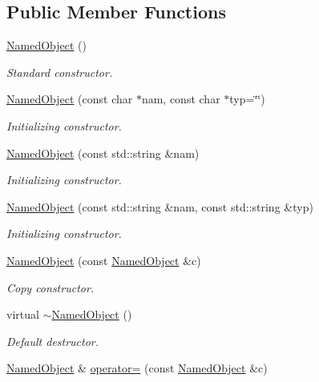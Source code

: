 \subsection*{Public Member Functions}
\begin{DoxyCompactItemize}
\item 
\hyperlink{class_d_d4hep_1_1_named_object_a210152aa261bc94e2012f6a0242faae0}{Named\+Object} ()
\begin{DoxyCompactList}\small\item\em Standard constructor. \end{DoxyCompactList}\item 
\hyperlink{class_d_d4hep_1_1_named_object_a8d1a329816f1cd08f79dc3fd34bd705a}{Named\+Object} (const char $\ast$nam, const char $\ast$typ=\char`\"{}\char`\"{})
\begin{DoxyCompactList}\small\item\em Initializing constructor. \end{DoxyCompactList}\item 
\hyperlink{class_d_d4hep_1_1_named_object_a5d287da6b18dfb39eda2bbac78dabfb3}{Named\+Object} (const std\+::string \&nam)
\begin{DoxyCompactList}\small\item\em Initializing constructor. \end{DoxyCompactList}\item 
\hyperlink{class_d_d4hep_1_1_named_object_ade52cf9617e164e408df2ca3bc2f90f5}{Named\+Object} (const std\+::string \&nam, const std\+::string \&typ)
\begin{DoxyCompactList}\small\item\em Initializing constructor. \end{DoxyCompactList}\item 
\hyperlink{class_d_d4hep_1_1_named_object_acf040390da871e998768cf0a9ea6fc98}{Named\+Object} (const \hyperlink{class_d_d4hep_1_1_named_object}{Named\+Object} \&c)
\begin{DoxyCompactList}\small\item\em Copy constructor. \end{DoxyCompactList}\item 
virtual \hyperlink{class_d_d4hep_1_1_named_object_ad13ddb19830d49ca540eb1491c40de03}{$\sim$\+Named\+Object} ()
\begin{DoxyCompactList}\small\item\em Default destructor. \end{DoxyCompactList}\item 
\hyperlink{class_d_d4hep_1_1_named_object}{Named\+Object} \& \hyperlink{class_d_d4hep_1_1_named_object_a474ed41e8d8b480401671dfe07b33eb6}{operator=} (const \hyperlink{class_d_d4hep_1_1_named_object}{Named\+Object} \&c)

\end{DoxyCompactItemize}
